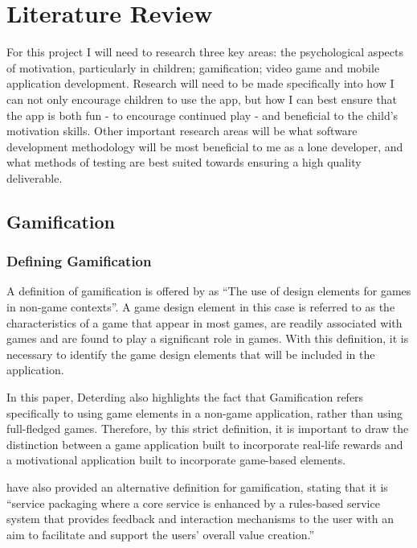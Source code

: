 \chapter{Literature Review}
\label{chap:litReview}

For this project I will need to research three key areas: the psychological aspects of motivation, particularly in children; gamification; video game and mobile application development.
Research will need to be made specifically into how I can not only encourage children to use the app, but how I can best ensure that the app is both fun - to encourage continued play - and beneficial to the child's motivation skills.
Other important research areas will be what software development methodology will be most beneficial to me as a lone developer, and what methods of testing are best suited towards ensuring a high quality deliverable.

\section{Gamification}
\subsection{Defining Gamification}
A definition of gamification is offered by \cite{Deterding:2011:GDE:2181037.2181040} as ``The use of design elements for games in non-game contexts''. 
A game design element in this case is referred to as the characteristics of a game that appear in most games, are readily associated with games and are found to play a significant role in games.
With this definition, it is necessary to identify the game design elements that will be included in the application. 

In this paper, Deterding also highlights the fact that Gamification refers specifically to using game elements in a non-game application, rather than using full-fledged games.
Therefore, by this strict definition, it is important to draw the distinction between a game application built to incorporate real-life rewards and a motivational application built to incorporate game-based elements.

\cite{huotari2011gamification} have also provided an alternative definition for gamification, stating that it is ``service packaging where a core service is enhanced by a rules-based service system that provides feedback and interaction mechanisms to the user with an aim to facilitate and support the users’ overall value creation.''

